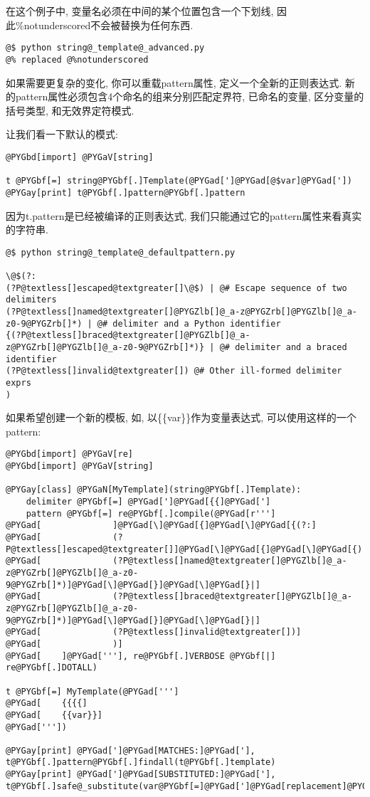 \documentclass[a4paper,10pt,english]{manual}
\begin{document}
在这个例子中, 变量名必须在中间的某个位置包含一个下划线, 因此\%notunderscored不会被替换为任何东西.

\begin{Verbatim}[commandchars=@\[\]]
@$ python string@_template@_advanced.py
@% replaced @%notunderscored
\end{Verbatim}

如果需要更复杂的变化, 你可以重载pattern属性, 定义一个全新的正则表达式. 新的pattern属性必须包含4个命名的组来分别匹配定界符, 已命名的变量, 区分变量的括号类型, 和无效界定符模式.

让我们看一下默认的模式:

\begin{Verbatim}[commandchars=@\[\]]
@PYGbd[import] @PYGaV[string]

t @PYGbf[=] string@PYGbf[.]Template(@PYGad[']@PYGad[@$var]@PYGad['])
@PYGay[print] t@PYGbf[.]pattern@PYGbf[.]pattern
\end{Verbatim}

因为t.pattern是已经被编译的正则表达式, 我们只能通过它的pattern属性来看真实的字符串.

\begin{Verbatim}[commandchars=@\[\]]
@$ python string@_template@_defaultpattern.py

\@$(?:
(?P@textless[]escaped@textgreater[]\@$) | @# Escape sequence of two delimiters
(?P@textless[]named@textgreater[]@PYGZlb[]@_a-z@PYGZrb[]@PYGZlb[]@_a-z0-9@PYGZrb[]*) | @# delimiter and a Python identifier
{(?P@textless[]braced@textgreater[]@PYGZlb[]@_a-z@PYGZrb[]@PYGZlb[]@_a-z0-9@PYGZrb[]*)} | @# delimiter and a braced identifier
(?P@textless[]invalid@textgreater[]) @# Other ill-formed delimiter exprs
)
\end{Verbatim}

如果希望创建一个新的模板, 如, 以\{\{var\}\}作为变量表达式, 可以使用这样的一个pattern:

\begin{Verbatim}[commandchars=@\[\]]
@PYGbd[import] @PYGaV[re]
@PYGbd[import] @PYGaV[string]

@PYGay[class] @PYGaN[MyTemplate](string@PYGbf[.]Template):
    delimiter @PYGbf[=] @PYGad[']@PYGad[{{]@PYGad[']
    pattern @PYGbf[=] re@PYGbf[.]compile(@PYGad[r''']
@PYGad[              ]@PYGad[\]@PYGad[{]@PYGad[\]@PYGad[{(?:]
@PYGad[              (?P@textless[]escaped@textgreater[]]@PYGad[\]@PYGad[{]@PYGad[\]@PYGad[{)|]
@PYGad[              (?P@textless[]named@textgreater[]@PYGZlb[]@_a-z@PYGZrb[]@PYGZlb[]@_a-z0-9@PYGZrb[]*)]@PYGad[\]@PYGad[}]@PYGad[\]@PYGad[}|]
@PYGad[              (?P@textless[]braced@textgreater[]@PYGZlb[]@_a-z@PYGZrb[]@PYGZlb[]@_a-z0-9@PYGZrb[]*)]@PYGad[\]@PYGad[}]@PYGad[\]@PYGad[}|]
@PYGad[              (?P@textless[]invalid@textgreater[])]
@PYGad[              )]
@PYGad[    ]@PYGad['''], re@PYGbf[.]VERBOSE @PYGbf[|] re@PYGbf[.]DOTALL)

t @PYGbf[=] MyTemplate(@PYGad[''']
@PYGad[    {{{{]
@PYGad[    {{var}}]
@PYGad['''])

@PYGay[print] @PYGad[']@PYGad[MATCHES:]@PYGad['], t@PYGbf[.]pattern@PYGbf[.]findall(t@PYGbf[.]template)
@PYGay[print] @PYGad[']@PYGad[SUBSTITUTED:]@PYGad['], t@PYGbf[.]safe@_substitute(var@PYGbf[=]@PYGad[']@PYGad[replacement]@PYGad['])
\end{Verbatim}
\end{document}

